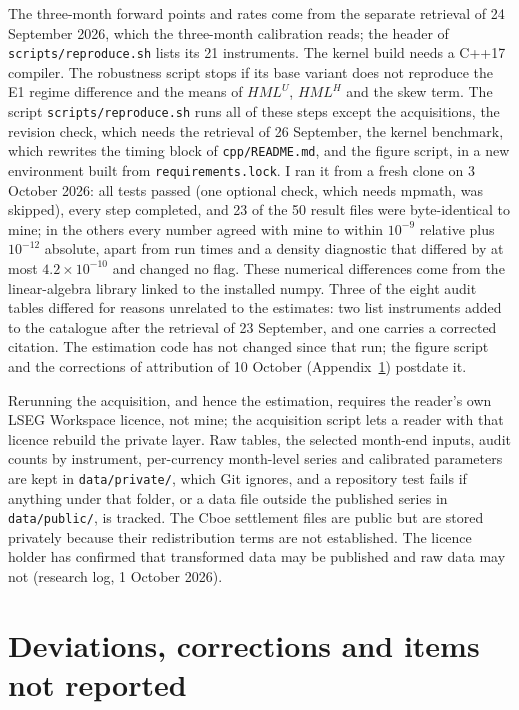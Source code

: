 \documentclass[11pt]{article}
\theoremstyle{result}
\newcommand{\HML}{\mathit{HML}}
\begin{document}
The three-month forward points and rates come from the separate retrieval of 24 September 2026, which the three-month calibration reads; the header of \texttt{scripts/reproduce.sh} lists its 21 instruments. The kernel build needs a C++17 compiler. The robustness script stops if its base variant does not reproduce the E1 regime difference and the means of $\HML^U$, $\HML^H$ and the skew term. The script \texttt{scripts/reproduce.sh} runs all of these steps except the acquisitions, the revision check, which needs the retrieval of 26 September, the kernel benchmark, which rewrites the timing block of \texttt{cpp/README.md}, and the figure script, in a new environment built from \texttt{requirements.lock}. I ran it from a fresh clone on 3 October 2026: all tests passed (one optional check, which needs mpmath, was skipped), every step completed, and 23 of the 50 result files were byte-identical to mine; in the others every number agreed with mine to within $10^{-9}$ relative plus $10^{-12}$ absolute, apart from run times and a density diagnostic that differed by at most $4.2\times10^{-10}$ and changed no flag. These numerical differences come from the linear-algebra library linked to the installed numpy. Three of the eight audit tables differed for reasons unrelated to the estimates: two list instruments added to the catalogue after the retrieval of 23 September, and one carries a corrected citation. The estimation code has not changed since that run; the figure script and the corrections of attribution of 10 October (Appendix~\ref{app:dev}) postdate it.

Rerunning the acquisition, and hence the estimation, requires the reader's own LSEG Workspace licence, not mine; the acquisition script lets a reader with that licence rebuild the private layer. Raw tables, the selected month-end inputs, audit counts by instrument, per-currency month-level series and calibrated parameters are kept in \texttt{data/private/}, which Git ignores, and a repository test fails if anything under that folder, or a data file outside the published series in \texttt{data/public/}, is tracked. The Cboe settlement files are public but are stored privately because their redistribution terms are not established. The licence holder has confirmed that transformed data may be published and raw data may not (research log, 1 October 2026).


\section{Deviations, corrections and items not reported}\label{app:dev}
\end{document}
